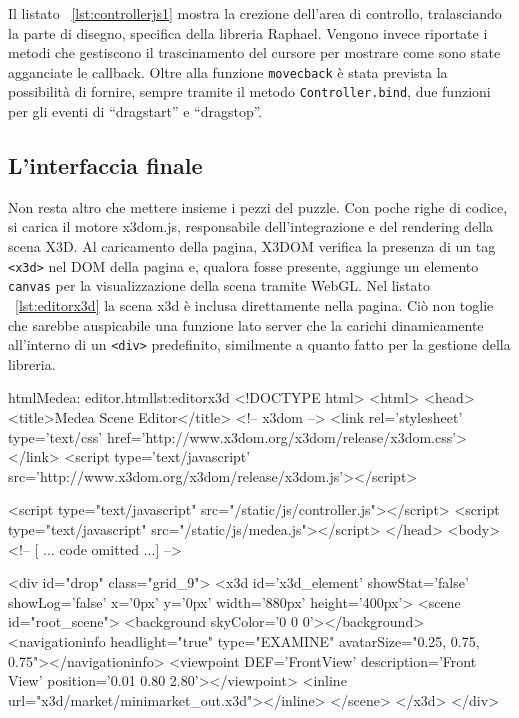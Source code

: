 Il listato ~\ref{lst:controllerjs1} mostra la crezione dell'area di controllo, tralasciando la parte di disegno, specifica della libreria Raphael. Vengono invece riportate i metodi che gestiscono il trascinamento del cursore per mostrare come sono state agganciate le callback. Oltre alla funzione \texttt{movecback} è stata prevista la possibilità di fornire, sempre tramite il metodo \texttt{Controller.bind}, due funzioni per gli eventi di ``dragstart'' e ``dragstop''.

\subsection{L'interfaccia finale}
Non resta altro che mettere insieme i pezzi del puzzle. Con poche righe di codice, si carica il motore x3dom.js, responsabile dell'integrazione e del rendering della scena X3D. Al caricamento della pagina, X3DOM verifica la presenza di un tag \texttt{<x3d>} nel DOM della pagina e, qualora fosse presente, aggiunge un elemento \texttt{canvas} per la visualizzazione della scena tramite WebGL. Nel listato ~\ref{lst:editorx3d} la scena x3d è inclusa direttamente nella pagina. Ciò non toglie che sarebbe auspicabile una funzione lato server che la carichi dinamicamente all'interno di un \texttt{<div>} predefinito, similmente a quanto fatto per la gestione della libreria.

\begin{mylisting}{html}{Medea: editor.html}{lst:editorx3d}
<!DOCTYPE html>
<html>
    <head>
        <title>Medea Scene Editor</title>
        <!-- x3dom -->
        <link rel='stylesheet' type='text/css' href='http://www.x3dom.org/x3dom/release/x3dom.css'></link>
        <script type='text/javascript' src='http://www.x3dom.org/x3dom/release/x3dom.js'></script>

        <script type="text/javascript" src="/static/js/controller.js"></script>
        <script type="text/javascript" src="/static/js/medea.js"></script>        
    </head>
    <body>
        <!-- [ ... code omitted ...] -->        
        
        <div id="drop" class="grid_9">
            <x3d id='x3d_element' showStat='false' showLog='false' x='0px' y='0px' width='880px' height='400px'>
                <scene id="root_scene">
                    <background skyColor='0 0 0'></background>
                    <navigationinfo headlight="true" type="EXAMINE" avatarSize="0.25, 0.75, 0.75"></navigationinfo>
                    <viewpoint DEF='FrontView' description='Front View' position='0.01 0.80 2.80'></viewpoint>
                    <inline url="x3d/market/minimarket_out.x3d"></inline>
                </scene>
            </x3d> 
        </div>
\end{mylisting}

